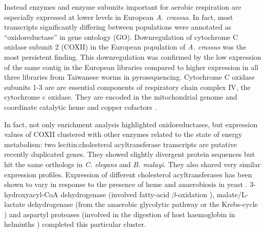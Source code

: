 \documentclass[10pt]{article}
\begin{document}
Instead enzymes and enzyme subunits important for aerobic respiration
are especially expressed at lower levels in European
\textit{A. crassus}. In fact, most transcripts significantly differing
between populations were annotated as ``oxidoreductase'' in gene
ontology (GO).
Downregulation of cytochrome C oxidase subunit 2 (COXII) in the
European population of \textit{A. crassus} was the most persistent
finding. This downregulation was confirmed by the low expression of
the same contig in the European libraries compared to higher
expression in all three libraries from Taiwanese worms in
pyrosequencing. Cytochrome C oxidase subunits 1-3 are are essential
components of respiratory chain complex IV, the cytochrome c
oxidase. They are encoded in the mitochondrial genome and coordinate
catalytic heme and copper cofactors \cite{pmid18023115}.

In fact, not only enrichment analysis highlighted oxidoreductases, but
expression values of COXII clustered with other enzymes related to the
state of energy metabolism: two lecitin:cholesterol acyltransferase
transcripts are putative recently duplicated genes. They showed
slightly divergent protein sequences but hit the same orthologs in
\textit{C. elegans} and \textit{B. malayi}. They also shared very
similar expression profiles. Expression of different cholesterol
acyltransferases has been shown to vary in response to the presence of
heme and anaerobiosis in yeast \cite{pmid11786267}. 3-hydroxyacyl-CoA
dehydrogenase (involved fatty-acid $\beta$-oxidation
\cite{pmid8454629}), malate/L-lactate dehydrogenase (from the
anaerobic glycolytic pathway or the Krebs-cycle
\cite{sturm1969vergleichende}) and aspartyl proteases (involved in the
digestion of host haemoglobin in helminths \cite{pmid12782060})
completed this particular cluster.
\end{document}
